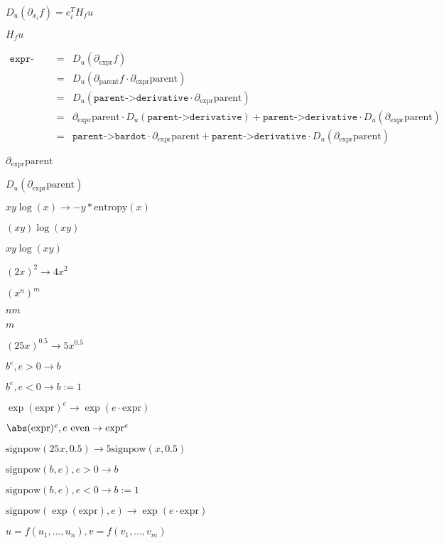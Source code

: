 \documentclass{article}
\begin{document}
$D_u (\partial_{x_i} f) = e_i^T H_f u$
\pagebreak

$H_f u$
\pagebreak

\begin{eqnarray*}
\texttt{expr->bardot} & = & D_u (\partial_{\text{expr}} f) \\
  & = & D_u ( \partial_{\text{parent}} f \cdot \partial_{\text{expr}} \text{parent} )  \\
  & = & D_u ( \texttt{parent->derivative} \cdot \partial_{\text{expr}} \text{parent} ) \\
  & = & \partial_{\text{expr}} \text{parent} \cdot D_u (\texttt{parent->derivative}) + \texttt{parent->derivative} \cdot D_u (\partial_{\text{expr}} \text{parent}) \\
  & = & \texttt{parent->bardot} \cdot \partial_{\text{expr}} \text{parent} + \texttt{parent->derivative} \cdot D_u (\partial_{\text{expr}} \text{parent})
\end{eqnarray*}
\pagebreak

$\partial_{\text{expr}} \text{parent}$
\pagebreak

$D_u (\partial_{\text{expr}} \text{parent})$
\pagebreak

$xy\log(x) \to - y * \mathrm{entropy}(x)$
\pagebreak

$(xy) \log(xy)$
\pagebreak

$xy \log(xy)$
\pagebreak

$(2x)^2 \to 4x^2$
\pagebreak

$(x^n)^m$
\pagebreak

$nm$
\pagebreak

$m$
\pagebreak

$(25x)^{0.5} \to 5 x^{0.5}$
\pagebreak

$b^e, e > 0 \to b$
\pagebreak

$b^e, e < 0 \to b := 1$
\pagebreak

$\exp(\text{expr})^e \to \exp(e\cdot\text{expr})$
\pagebreak

$\abs(\text{expr})^e, e \text{ even} \to \text{expr}^e$
\pagebreak

$\mathrm{signpow}(25x,0.5) \to 5\mathrm{signpow}(x,0.5)$
\pagebreak

$\mathrm{signpow}(b,e), e > 0 \to b$
\pagebreak

$\mathrm{signpow}(b,e), e < 0 \to b := 1$
\pagebreak

$\mathrm{signpow}(\exp(\text{expr}),e) \to \exp(e\cdot\text{expr})$
\pagebreak

$u = f(u_1, ..., u_n), v = f(v_1, ..., v_m)$
\pagebreak
\end{document}
